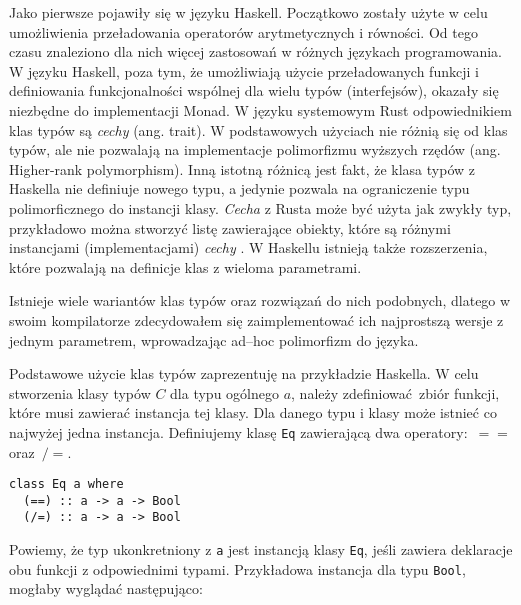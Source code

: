 \documentclass[declaration,shortabstract]{iithesis}
\begin{document}

Jako pierwsze pojawiły się w języku Haskell\cite{tc_wiki}. 
Początkowo zostały użyte w celu umożliwienia przeładowania operatorów 
arytmetycznych i równości. Od tego czasu
znaleziono dla nich więcej zastosowań w różnych językach programowania. W języku
Haskell, poza tym, że umożliwiają użycie przeładowanych funkcji i definiowania 
funkcjonalności wspólnej dla wielu typów (interfejsów), okazały się niezbędne 
do implementacji Monad. W języku systemowym Rust odpowiednikiem klas typów są
\textit{cechy} (ang. trait). W podstawowych użyciach nie różnią się od klas typów, ale 
nie pozwalają na implementacje polimorfizmu wyższych rzędów 
\cite{no_hkt_in_rust} (ang. 
Higher-rank polymorphism). Inną istotną różnicą jest fakt, że klasa typów z 
Haskella nie definiuje nowego typu, a jedynie pozwala na ograniczenie typu
polimorficznego do 
instancji klasy. \textit{Cecha} z Rusta może być użyta jak zwykły typ, przykładowo 
można stworzyć listę zawierające obiekty, które są różnymi instancjami 
(implementacjami) \textit{cechy} \cite{traits_as_obj_rust}. 
W Haskellu istnieją także rozszerzenia, które 
pozwalają na definicje klas z wieloma parametrami. 


Istnieje wiele wariantów klas typów oraz rozwiązań do nich podobnych, dlatego w swoim 
kompilatorze zdecydowałem się zaimplementować ich najprostszą wersje z jednym 
parametrem, wprowadzając ad--hoc polimorfizm do języka.

Podstawowe użycie klas typów zaprezentuję na przykładzie Haskella. 
W celu stworzenia klasy typów $C$ dla typu ogólnego $a$, należy 
zdefiniować zbiór funkcji, które musi zawierać instancja tej klasy. Dla danego 
typu i klasy może istnieć co najwyżej jedna instancja. 
Definiujemy klasę \texttt{Eq} zawierającą dwa operatory:~$==$ oraz~$/=$.
\begin{lstlisting}[frame=lines]
class Eq a where
  (==) :: a -> a -> Bool
  (/=) :: a -> a -> Bool
\end{lstlisting}

Powiemy, że typ ukonkretniony z \texttt{a} jest instancją klasy \texttt{Eq}, 
jeśli zawiera deklaracje obu funkcji z odpowiednimi typami. Przykładowa 
instancja dla typu \texttt{Bool}, mogłaby wyglądać następująco:
\end{document}
